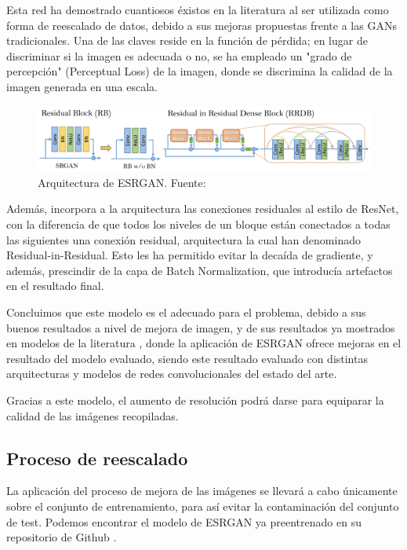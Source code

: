 Esta red ha demostrado cuantiosos éxistos en la literatura al ser utilizada como forma de reescalado de datos, debido a sus mejoras propuestas frente a las GANs tradicionales. Una de las claves reside en la función de pérdida; en lugar de discriminar si la imagen es adecuada o no, se ha empleado un "grado de percepción" (Perceptual Loss) de la imagen, donde se discrimina la calidad de la imagen generada en una escala. \\

\begin{figure}[H]
	\centering
	\label {fig:esrgan}
	\includegraphics[scale = 0.2]{imagenes/esrgan.png}
	\caption{Arquitectura de ESRGAN. Fuente: \cite{wang2018esrgan}}
\end{figure}


Además, incorpora a la arquitectura las conexiones residuales al estilo de ResNet, con la diferencia de que todos los niveles de un bloque están conectados a todas las siguientes una conexión residual, arquitectura la cual han denominado Residual-in-Residual. Esto les ha permitido evitar la decaída de gradiente, y además, prescindir de la capa de Batch Normalization, que introducía artefactos en el resultado final.

Concluimos que este modelo es el adecuado para el problema, debido a sus buenos resultados a nivel de mejora de imagen, y de sus resultados ya mostrados en modelos de la literatura \cite{healthcare10071183}, donde la aplicación de ESRGAN ofrece mejoras en el resultado del modelo evaluado, siendo este resultado evaluado con distintas arquitecturas y modelos de redes convolucionales del estado del arte.

Gracias a este modelo, el aumento de resolución podrá darse para equiparar la calidad de las imágenes recopiladas.

\subsection{Proceso de reescalado}

La aplicación del proceso de mejora de las imágenes se llevará a cabo únicamente sobre el conjunto de entrenamiento, para así evitar la contaminación del conjunto de test. Podemos encontrar el modelo de ESRGAN ya preentrenado en su repositorio de Github \cite{gitesrgan}.

